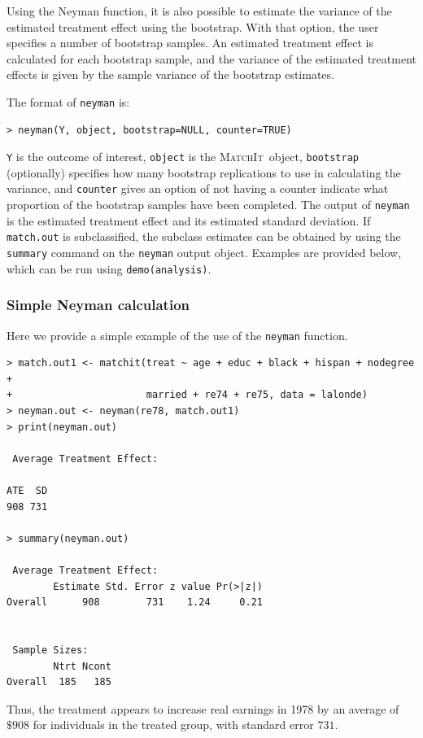 \documentclass[oneside,letterpaper,titlepage]{article}
\newcommand{\MatchIt}{\textsc{MatchIt}}
\begin{document}
Using the Neyman function, it is also possible to estimate the
variance of the estimated treatment effect using the bootstrap.  With
that option, the user specifies a number of bootstrap samples.  An
estimated treatment effect is calculated for each bootstrap sample,
and the variance of the estimated treatment effects is given by the
sample variance of the bootstrap estimates.  

The format of {\tt neyman} is:

\begin{verbatim}
> neyman(Y, object, bootstrap=NULL, counter=TRUE)
\end{verbatim}

{\tt Y} is the outcome of interest, {\tt object} is the \MatchIt\ 
object, {\tt bootstrap} (optionally) specifies how many bootstrap
replications to use in calculating the variance, and {\tt counter}
gives an option of not having a counter indicate what proportion of
the bootstrap samples have been completed.  The output of {\tt neyman}
is the estimated treatment effect and its estimated standard
deviation.  If {\tt match.out} is subclassified, the subclass
estimates can be obtained by using the {\tt summary} command on the
{\tt neyman} output object.  Examples are provided below, which can be
run using {\tt demo(analysis)}.

\subsubsection{Simple Neyman calculation}
Here we provide a simple example of the use of the {\tt neyman} function.

\begin{verbatim}
> match.out1 <- matchit(treat ~ age + educ + black + hispan + nodegree +
+                       married + re74 + re75, data = lalonde)
> neyman.out <- neyman(re78, match.out1)
> print(neyman.out)
 
 Average Treatment Effect:
  
ATE  SD
908 731
 
> summary(neyman.out)
 
 Average Treatment Effect:
        Estimate Std. Error z value Pr(>|z|)
Overall      908        731    1.24     0.21
 
 
 Sample Sizes:
        Ntrt Ncont
Overall  185   185
\end{verbatim}

Thus, the treatment appears to increase real earnings in 1978 by an
average of $\$908$ for individuals in the treated group, with standard
error $731$.
\end{document}
